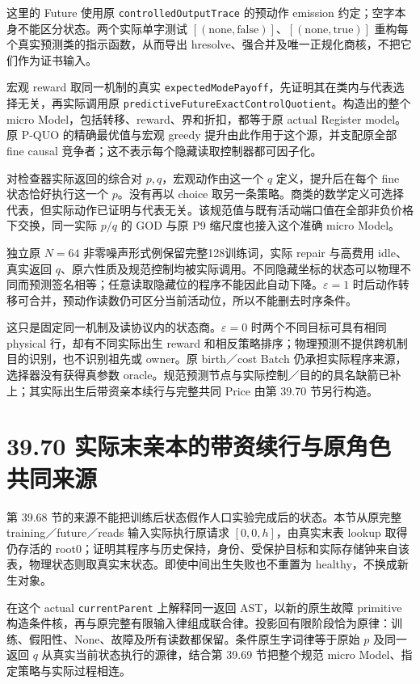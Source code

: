 \documentclass[
  11pt,
  oneside]{book}
\newcounter{none} %
\begin{document}
这里的 Future 使用原 \nolinkurl{controlledOutputTrace} 的预动作 emission 约定；空字本身不能区分状态。两个实际单字测试 \([(\mathrm{none},\mathrm{false})]\)、\([(\mathrm{none},\mathrm{true})]\) 重构每个真实预测类的指示函数，从而导出 hresolve、强合并及唯一正规化商核，不把它们作为证书输入。

宏观 reward 取同一机制的真实 \nolinkurl{expectedModePayoff}，先证明其在类内与代表选择无关，再实际调用原 \nolinkurl{predictiveFutureExactControlQuotient}。构造出的整个 micro Model，包括转移、reward、界和折扣，都等于原 actual Register model。原 P-QUO 的精确最优值与宏观 greedy 提升由此作用于这个源，并支配原全部 fine causal 竞争者；这不表示每个隐藏读取控制器都可因子化。

对检查器实际返回的综合对 \(p,q\)，宏观动作由这一个 \(q\) 定义，提升后在每个 fine 状态恰好执行这一个 \(p\)。没有再以 choice 取另一条策略。商类的数学定义可选择代表，但实际动作已证明与代表无关。该规范值与既有活动端口值在全部非负价格下交换，同一实际 \(p/q\) 的 GOD 与原 P9 缩尺度也接入这个准确 micro Model。

独立原 \(N=64\) 非零噪声形式例保留完整128训练词，实际 repair 与高费用 idle、真实返回 \(q\)、原六性质及规范控制均被实际调用。不同隐藏坐标的状态可以物理不同而预测签名相等；任意读取隐藏位的程序不能因此自动下降。\(\varepsilon=1\) 时后动作转移可合并，预动作读数仍可区分当前活动位，所以不能删去时序条件。

这只是固定同一机制及读协议内的状态商。\(\varepsilon=0\) 时两个不同目标可具有相同 physical 行，却有不同实际出生 reward 和相反策略排序；物理预测不提供跨机制目的识别，也不识别祖先或 owner。原 birth／cost Batch 仍承担实际程序来源，选择器没有获得真参数 oracle。规范预测节点与实际控制／目的的具名缺箭已补上；其实际出生后带资亲本续行与完整共同 Price 由第 39.70 节另行构造。

\section{39.70 实际末亲本的带资续行与原角色共同来源}\label{ux5b9eux9645ux672bux4eb2ux672cux7684ux5e26ux8d44ux7eedux884cux4e0eux539fux89d2ux8272ux5171ux540cux6765ux6e90}

第 39.68 节的来源不能把训练后状态假作人口实验完成后的状态。本节从原完整 training／future／reads 输入实际执行原请求 \([0,0,h]\)，由真实末表 lookup 取得仍存活的 root0；证明其程序与历史保持，身份、受保护目标和实际存储钟来自该表，物理状态则取真实末状态。即使中间出生失败也不重置为 healthy，不换成新生对象。

在这个 actual \nolinkurl{currentParent} 上解释同一返回 AST，以新的原生故障 primitive 构造条件核，再与原完整有限输入律组成联合律。投影回有限阶段恰为原律：训练、假阳性、None、故障及所有读数都保留。条件原生字词律等于原始 \(p\) 及同一返回 \(q\) 从真实当前状态执行的源律，结合第 39.69 节把整个规范 micro Model、指定策略与实际过程相连。
\end{document}
